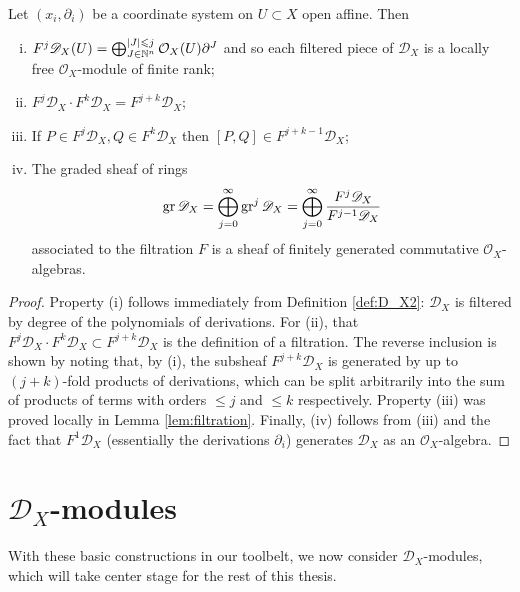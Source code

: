 \begin{proposition}
    Let $(x_i, \partial_i)$ be a coordinate system on $U\subset X$ open affine.
    Then
    \begin{enumerate}[(i)]
        \item $F^j\mathscr{D}_X(U)=\bigoplus_{J\in\mathbb{N}^n}^{|J|\leqslant j}\mathcal{O}_X(U)\partial^J$ and so
            each filtered piece of $\mathscr{D}_X$ is a locally free $\mathcal{O}_X$-module of finite rank;
        \item $F^j\mathscr{D}_X\cdot F^k\mathscr{D}_X=F^{j+k}\mathscr{D}_X$;
        \item If $P\in F^j\mathscr{D}_X, Q\in F^k\mathscr{D}_X$ then $[P,Q]\in F^{j+k-1}\mathscr{D}_X$;
        \item The graded sheaf of rings 
            \[\operatorname{gr}\mathscr{D}_X = \bigoplus_{j=0}^\infty\operatorname{gr}^j\mathscr{D}_X = \bigoplus_{j=0}^\infty\frac{F^j\mathscr{D}_X}{F^{j-1}\mathscr{D}_X}\]
            associated to the filtration $F$ is a sheaf of finitely generated commutative $\mathcal{O}_X$-algebras.
    \end{enumerate}
\end{proposition}
\begin{proof}
    Property (i) follows immediately from Definition \ref{def:D_X2}: $\mathscr{D}_X$ is filtered
    by degree of the polynomials of derivations. 
    For (ii), that $F^j\mathscr{D}_X\cdot F^k\mathscr{D}_X\subset F^{j+k}\mathscr{D}_X$ is the definition
    of a filtration. The reverse inclusion is shown by noting that, by (i), the subsheaf $F^{j+k}\mathscr{D}_X$ is
    generated by up to $(j+k)$-fold products of derivations, which can be split arbitrarily into the
    sum of products of terms with orders $\leqslant j$ and $\leqslant k$ respectively.
    Property (iii) was proved locally in Lemma \ref{lem:filtration}.
    Finally, (iv) follows from (iii) and the fact that $F^1\mathscr{D}_X$ (essentially the derivations
    $\partial_i$) generates $\mathscr{D}_X$ as an $\mathcal{O}_X$-algebra.
\end{proof}


\section{$\mathscr{D}_X$-modules}

With these basic constructions in our toolbelt, we now consider $\mathscr{D}_X$-modules,
which will take center stage for the rest of this thesis.


